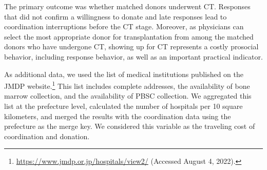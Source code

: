 \documentclass[12pt, a4paper]{article}
\begin{document}
The primary outcome was whether matched donors underwent CT. Responses that did not confirm a willingness to donate and late responses lead to coordination interruptions before the CT stage. Moreover, as physicians can select the most appropriate donor for transplantation from among the matched donors who have undergone CT, showing up for CT represents a costly prosocial behavior, including response behavior, as well as an important practical indicator.

As additional data, we used the list of medical institutions published on the JMDP website.\footnote{\url{https://www.jmdp.or.jp/hospitals/view2/} (Accessed August 4, 2022).} This list includes complete addresses, the availability of bone marrow collection, and the availability of PBSC collection. We aggregated this list at the prefecture level, calculated the number of hospitals per 10 square kilometers, and merged the results with the coordination data using the prefecture as the merge key. We considered this variable as the traveling cost of coordination and donation.
\end{document}
